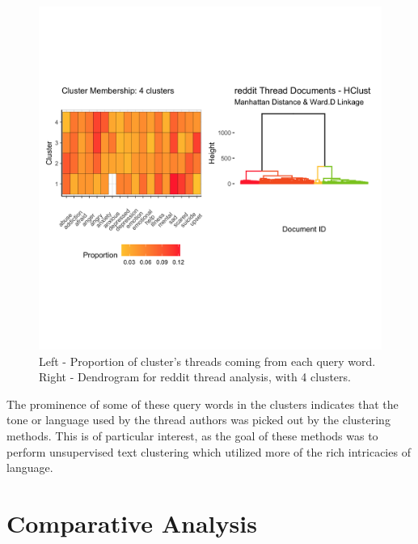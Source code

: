 \begin{figure}
\includegraphics[width=6in]{Content/Images/k4_reddit_clusters.png}
\caption{Left - Proportion of cluster's threads coming from each query word. Right - Dendrogram for reddit thread analysis, with 4 clusters.}
\end{figure}

The prominence of some of these query words in the clusters indicates that the tone or language used by the thread authors was picked out by the clustering methods. This is of particular interest, as the goal of these methods was to perform unsupervised text clustering which utilized more of the rich intricacies of language.\\

\section{Comparative Analysis}

